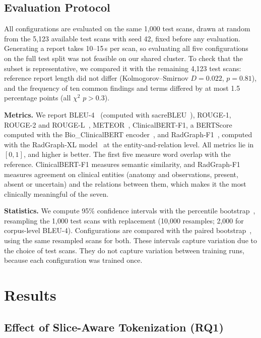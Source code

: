 \documentclass[conference]{IEEEtran}
\begin{document}
\subsection{Evaluation Protocol}
All configurations are evaluated on the same 1,000 test scans, drawn at
random from the 5,123 available test scans with seed 42, fixed before any
evaluation. Generating a report takes 10--15\,s per scan, so evaluating all
five configurations on the full test split was not feasible on our shared
cluster. To check that the subset is representative, we compared it with the
remaining 4,123 test scans: reference report length did not differ
(Kolmogorov--Smirnov $D=0.022$, $p=0.81$), and the frequency of ten common
findings and terms differed by at most 1.5 percentage points (all
$\chi^2$ $p>0.3$).

\textbf{Metrics.} We report BLEU-4~\cite{bleu} (computed with
sacreBLEU~\cite{sacrebleu}), ROUGE-1, ROUGE-2 and ROUGE-L~\cite{rouge},
METEOR~\cite{meteor}, ClinicalBERT-F1, a BERTScore~\cite{bertscore} computed
with the Bio\_ClinicalBERT encoder~\cite{clinicalbert}, and
RadGraph-F1~\cite{radgraph,f1radgraph}, computed with the RadGraph-XL
model~\cite{radgraphxl} at the entity-and-relation level. All metrics lie in
$[0,1]$, and higher is better. The first five measure word overlap with the
reference. ClinicalBERT-F1 measures semantic similarity, and RadGraph-F1
measures agreement on clinical entities (anatomy and observations, present,
absent or uncertain) and the relations between them, which makes it the most
clinically meaningful of the seven.

\textbf{Statistics.} We compute 95\% confidence intervals with the percentile
bootstrap~\cite{efron1993}, resampling the 1,000 test scans with replacement
(10,000 resamples; 2,000 for corpus-level BLEU-4). Configurations are
compared with the paired bootstrap~\cite{koehn2004}, using the same resampled
scans for both. These intervals capture variation due to the choice of test
scans. They do not capture variation between training runs, because each
configuration was trained once.

\section{Results}

\subsection{Effect of Slice-Aware Tokenization (RQ1)}
\end{document}
